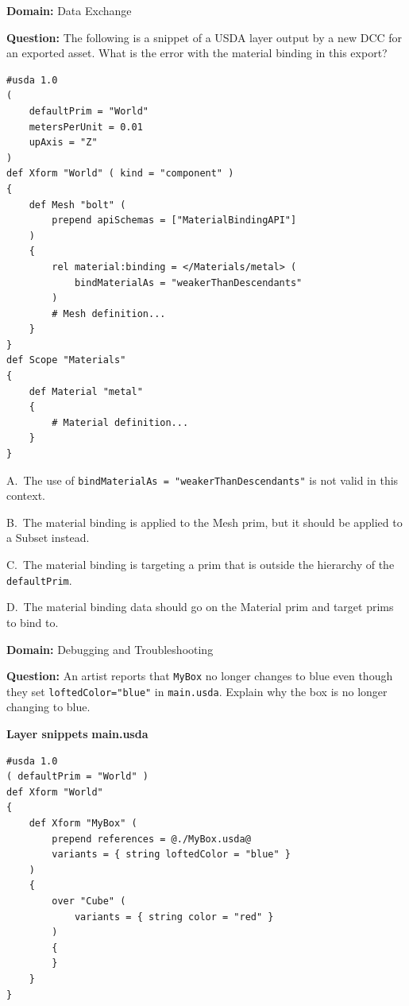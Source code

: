 \noindent\textbf{Domain:} Data Exchange\par
\vspace{0.4em}
\noindent\textbf{Question:} The following is a snippet of a USDA layer output by a new DCC for an exported asset. What is the error with the material binding in this export?
\begin{lstlisting}
#usda 1.0
(
    defaultPrim = "World"
    metersPerUnit = 0.01
    upAxis = "Z"
)
def Xform "World" ( kind = "component" )
{
    def Mesh "bolt" (
        prepend apiSchemas = ["MaterialBindingAPI"]
    )
    {
        rel material:binding = </Materials/metal> (
            bindMaterialAs = "weakerThanDescendants"
        )
        # Mesh definition...
    }
}
def Scope "Materials"
{
    def Material "metal"
    {
        # Material definition...
    }
}
\end{lstlisting}

\begin{Choices}
  \item A.\ The use of \texttt{bindMaterialAs = "weakerThanDescendants"} is not valid in this context.
  \item B.\ The material binding is applied to the Mesh prim, but it should be applied to a Subset instead.
  \item C.\ The material binding is targeting a prim that is outside the hierarchy of the \texttt{defaultPrim}.
  \item D.\ The material binding data should go on the Material prim and target prims to bind to.
\end{Choices}

\noindent\textbf{Domain:} Debugging and Troubleshooting\par
\vspace{0.4em}
\noindent\textbf{Question:} An artist reports that \texttt{MyBox} no longer changes to blue even though they set \texttt{loftedColor="blue"} in \texttt{main.usda}. Explain why the box is no longer changing to blue.

\par\vspace{0.4em}\noindent\textbf{Layer snippets}
\noindent\textbf{main.usda}
\begin{lstlisting}
#usda 1.0
( defaultPrim = "World" )
def Xform "World"
{
    def Xform "MyBox" (
        prepend references = @./MyBox.usda@
        variants = { string loftedColor = "blue" }
    )
    {
        over "Cube" (
            variants = { string color = "red" }
        )
        {
        }
    }
}
\end{lstlisting}

